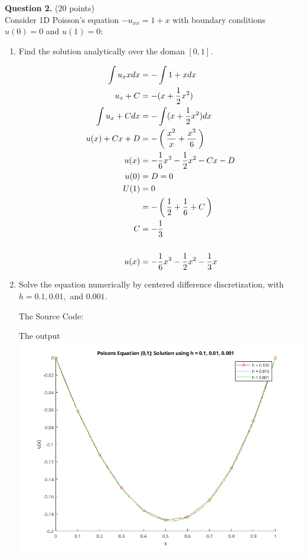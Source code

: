 \documentclass[10pt,a4paper]{report}
\newcommand{\BLUE}[1]{\textcolor{blue}{#1}}
\begin{document}
\newpage
\textbf{Question 2.} (20 points) \\

Consider 1D Poisson's equation $-u_{xx}=1+x$ with boundary conditions $u(0)=0$ and $u(1)=0$:

\begin{enumerate}[label=(\alph*)]

	\item Find the solution analytically over the doman $[0,1]$.
	
	\BLUE{\begin{align*}
			\int u_xx dx &= -\int 1+x dx \\
			u_x+C &= -(x+\frac{1}{2}x^2) \\
			\int u_x+C dx &= -\int (x+\frac{1}{2}x^2) dx \\
			u(x) +Cx + D &= -\left (\, \frac{x^2}{x} + \frac{x^3}{6} \,\right ) \\
			u(x) &= -\frac{1}{6}x^3-\frac{1}{2}x^2 - Cx - D \\
			u(0) &= D = 0 \\
			U(1) &= 0 \\
			&= -\left (\, \frac{1}{2} + \frac{1}{6} + C \,\right )\\
			C &= -\frac{1}{3} \\ \\
			u(x) &= -\frac{1}{6}x^3-\frac{1}{2}x^2 - \frac{1}{3}x
		\end{align*}	
	}
	
	\item Solve the equation numerically by centered difference discretization, with $h=0.1,0.01,$ and $0.001$.
	
	The Source Code:
	
	
	The output \\
	\includegraphics[scale=0.5]{530103a.png} 


\end{enumerate}
\end{document}
